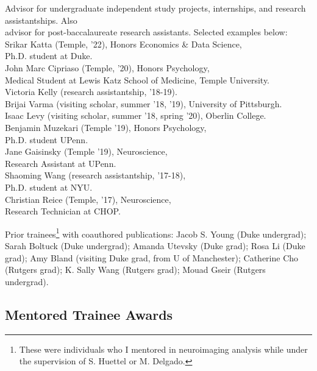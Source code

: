 \documentclass[11pt, letterpaper]{article}
\begin{document}
\begin{tabbing}
Advisor for undergraduate independent study projects, internships, and research assistantships. Also \\
\> advisor for post-baccalaureate research assistants. Selected examples below: \\  [.1cm]

\> Srikar Katta (Temple, '22), Honors Economics \& Data Science, \\
\> \> Ph.D. student at Duke. \\
\> John Marc Cipriaso (Temple, '20), Honors Psychology, \\
\> \> Medical Student at Lewis Katz School of Medicine, Temple University. \\
\> Victoria Kelly (research assistantship, '18-19). \\
\> Brijai Varma (visiting scholar, summer '18, '19), University of Pittsburgh. \\
\> Isaac Levy (visiting scholar, summer '18, spring '20), Oberlin College. \\
\> Benjamin Muzekari (Temple '19), Honors Psychology, \\
\> \> Ph.D. student UPenn. \\
\> Jane Gaisinsky (Temple '19), Neuroscience, \\
\> \> Research Assistant at UPenn. \\
\> Shaoming Wang (research assistantship, '17-18), \\
\> \> Ph.D. student at NYU. \\
\> Christian Reice (Temple, '17), Neuroscience, \\
\> \> Research Technician at CHOP.

\end{tabbing}

\begin{hangparas}{.5in}{1}
Prior trainees\footnote{These were individuals who I mentored in neuroimaging analysis while under the supervision of S. Huettel or M. Delgado.} with coauthored publications: Jacob S. Young (Duke undergrad); Sarah Boltuck (Duke undergrad); Amanda Utevsky (Duke grad); Rosa Li (Duke grad); Amy Bland (visiting Duke grad, from U of Manchester); Catherine Cho (Rutgers grad); K. Sally Wang (Rutgers grad); Mouad Gseir (Rutgers undergrad).
\end{hangparas}


\subsection*{Mentored Trainee Awards}
\end{document}
